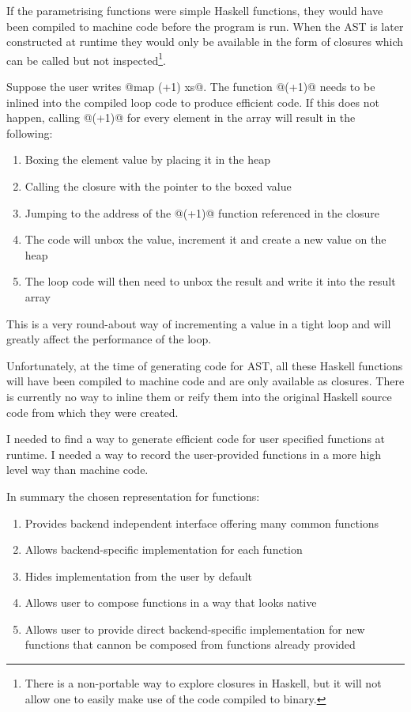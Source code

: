 \documentclass[preamble.tex]{subfiles}
\begin{document}
If the parametrising functions were simple Haskell functions, they would have been compiled to machine code before the program is run. When the AST is later constructed at runtime they would only be available in the form of closures which can be called but not inspected\footnote{There is a non-portable way to explore closures in Haskell, but it will not allow one to easily make use of the code compiled to binary.}.

Suppose the user writes @map (+1) xs@. The function @(+1)@ needs to be inlined into the compiled loop code to produce efficient code. If this does not happen, calling @(+1)@ for every element in the array will result in the following:

\begin{enumerate}
\item Boxing the element value by placing it in the heap
\item Calling the closure with the pointer to the boxed value
\item Jumping to the address of the @(+1)@ function referenced in the closure
\item The code will unbox the value, increment it and create a new value on the heap
\item The loop code will then need to unbox the result and write it into the result array
\end{enumerate}

This is a very round-about way of incrementing a value in a tight loop and will greatly affect the performance of the loop.

Unfortunately, at the time of generating code for AST, all these Haskell functions will have been compiled to machine code and are only available as closures. There is currently no way to inline them or reify them into the original Haskell source code from which they were created.

I needed to find a way to generate efficient code for user specified functions at runtime. I needed a way to record the user-provided functions in a more high level way than machine code.

In summary the chosen representation for functions:
\begin{enumerate}
\item Provides backend independent interface offering many common functions
\item Allows backend-specific implementation for each function
\item Hides implementation from the user by default
\item Allows user to compose functions in a way that looks native
\item Allows user to provide direct backend-specific implementation for new functions that cannon be composed from functions already provided
\end{enumerate}
\end{document}
